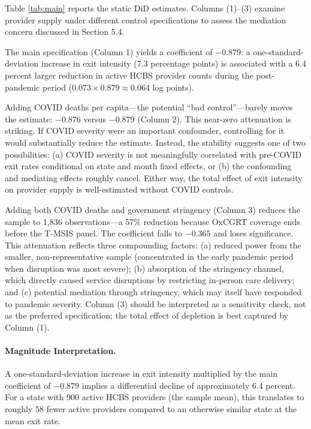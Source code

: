 \documentclass[12pt]{article}
\begin{document}
Table \ref{tab:main} reports the static DiD estimates. Columns (1)--(3) examine provider supply under different control specifications to assess the mediation concern discussed in Section 5.4.

The main specification (Column 1) yields a coefficient of $-0.879$: a one-standard-deviation increase in exit intensity (7.3 percentage points) is associated with a 6.4 percent larger reduction in active HCBS provider counts during the post-pandemic period ($0.073 \times 0.879 \approx 0.064$ log points).

Adding COVID deaths per capita---the potential ``bad control''---barely moves the estimate: $-0.876$ versus $-0.879$ (Column 2). This near-zero attenuation is striking. If COVID severity were an important confounder, controlling for it would substantially reduce the estimate. Instead, the stability suggests one of two possibilities: (a) COVID severity is not meaningfully correlated with pre-COVID exit rates conditional on state and month fixed effects, or (b) the confounding and mediating effects roughly cancel. Either way, the total effect of exit intensity on provider supply is well-estimated without COVID controls.

Adding both COVID deaths and government stringency (Column 3) reduces the sample to 1,836 observations---a 57\% reduction because OxCGRT coverage ends before the T-MSIS panel. The coefficient falls to $-0.365$ and loses significance. This attenuation reflects three compounding factors: (a) reduced power from the smaller, non-representative sample (concentrated in the early pandemic period when disruption was most severe); (b) absorption of the stringency channel, which directly caused service disruptions by restricting in-person care delivery; and (c) potential mediation through stringency, which may itself have responded to pandemic severity. Column (3) should be interpreted as a sensitivity check, not as the preferred specification; the total effect of depletion is best captured by Column (1).



\paragraph{Magnitude Interpretation.} A one-standard-deviation increase in exit intensity multiplied by the main coefficient of $-0.879$ implies a differential decline of approximately 6.4 percent. For a state with 900 active HCBS providers (the sample mean), this translates to roughly 58 fewer active providers compared to an otherwise similar state at the mean exit rate.
\end{document}
